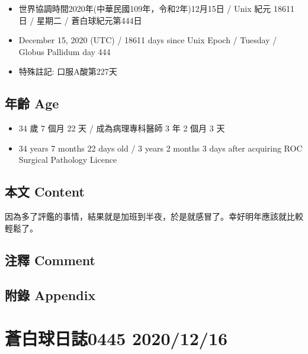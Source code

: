 \documentclass[a5paper, 10pt
]{book}
\providecommand{\tightlist}{%
  \setlength{\itemsep}{0pt}\setlength{\parskip}{0pt}}
\begin{document}
\begin{itemize}
\tightlist
\item
  世界協調時間2020年(中華民國109年，令和2年)12月15日 / Unix 紀元 18611
  日 / 星期二 / 蒼白球紀元第444日
\item
  December 15, 2020 (UTC) / 18611 days since Unix Epoch / Tuesday /
  Globus Pallidum day 444
\item
  特殊註記: 口服A酸第227天
\end{itemize}

\hypertarget{ux5e74ux9f61-age-14}{%
\subsection{年齡 Age}\label{ux5e74ux9f61-age-14}}

\begin{itemize}
\tightlist
\item
  34 歲 7 個月 22 天 / 成為病理專科醫師 3 年 2 個月 3 天
\item
  34 years 7 months 22 days old / 3 years 2 months 3 days after
  acquiring ROC Surgical Pathology Licence
\end{itemize}

\hypertarget{ux672cux6587-content-14}{%
\subsection{本文 Content}\label{ux672cux6587-content-14}}

因為多了評鑑的事情，結果就是加班到半夜，於是就感冒了。幸好明年應該就比較輕鬆了。

\hypertarget{ux6ce8ux91cb-comment-14}{%
\subsection{注釋 Comment}\label{ux6ce8ux91cb-comment-14}}

\hypertarget{ux9644ux9304-appendix-14}{%
\subsection{附錄 Appendix}\label{ux9644ux9304-appendix-14}}

\hypertarget{ux84bcux767dux7403ux65e5ux8a8c0445-20201216}{%
\section{蒼白球日誌0445
2020/12/16}\label{ux84bcux767dux7403ux65e5ux8a8c0445-20201216}}
\end{document}
